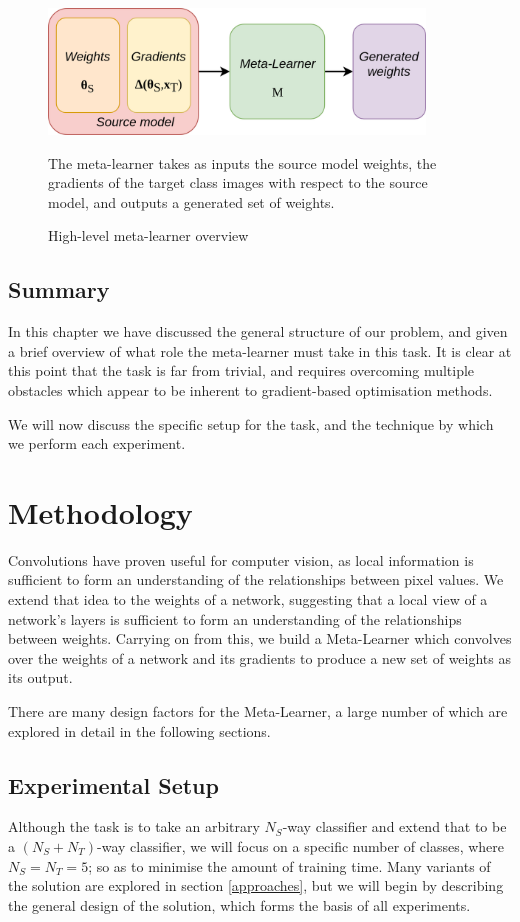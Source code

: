 \documentclass{report}
\begin{document}
\begin{figure}[!h]
 \centering
 \includegraphics[width=10cm]{ml-highlevel-overview}
 \caption{High-level meta-learner overview}
 The meta-learner takes as inputs the source model weights, the gradients of the target class images with respect to the source model, and outputs a generated set of weights.
 \label{fig:metalearnersimple:1}
\end{figure}

\section{Summary}
In this chapter we have discussed the general structure of our problem, and given a brief overview of what role the meta-learner must take in this task. It is clear at this point that the task is far from trivial, and requires overcoming multiple obstacles which appear to be inherent to gradient-based optimisation methods. \par
We will now discuss the specific setup for the task, and the technique by which we perform each experiment. \\


\chapter{Methodology}
Convolutions have proven useful for computer vision, as local information is sufficient to form an understanding of the relationships between pixel values. We extend that idea to the weights of a network, suggesting that a local view of a network's layers is sufficient to form an understanding of the relationships between weights. Carrying on from this, we build a Meta-Learner which convolves over the weights of a network and its gradients to produce a new set of weights as its output. \par
There are many design factors for the Meta-Learner, a large number of which are explored in detail in the following sections. \par


\section{Experimental Setup} \label{commonalities}
Although the task is to take an arbitrary $N_{S}$-way classifier and extend that to be a $(N_{S}+N_{T})$-way classifier, we will focus on a specific number of classes, where $N_{S} = N_{T} = 5$; so as to minimise the amount of training time. Many variants of the solution are explored in section \ref{approaches}, but we will begin by describing the general design of the solution, which forms the basis of all experiments.
\end{document}
